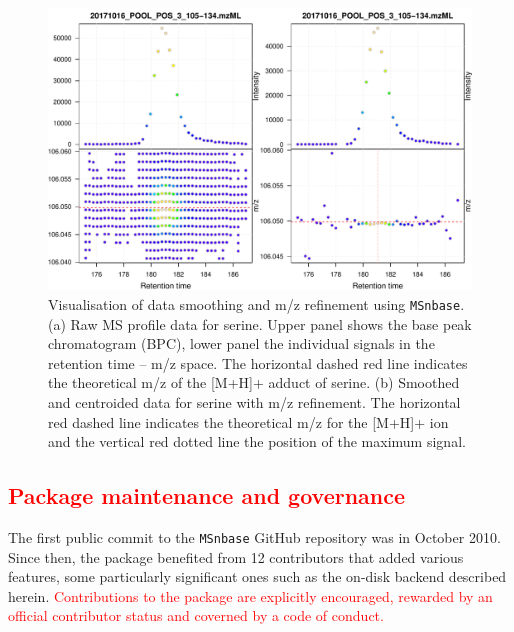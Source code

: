 \documentclass[journal=jacsat,manuscript=article]{achemso}\usepackage[]{graphicx}\usepackage[]{color}
\begin{document}
\begin{figure}
  \centering
  \includegraphics[width=\linewidth]{./figure/centroiding.pdf}
  \caption{Visualisation of data smoothing and m/z refinement using
    \texttt{MSnbase}. (a) Raw MS profile data for serine. Upper panel
    shows the base peak chromatogram (BPC), lower panel the individual
    signals in the retention time -- m/z space. The horizontal dashed
    red line indicates the theoretical m/z of the [M+H]+ adduct of
    serine. (b) Smoothed and centroided data for serine with m/z
    refinement. The horizontal red dashed line indicates the
    theoretical m/z for the [M+H]+ ion and the vertical red dotted
    line the position of the maximum signal. }
  \label{fig:cent}
\end{figure}


\subsection{\textcolor{red}{Package maintenance and governance}}

The first public commit to the \texttt{MSnbase} GitHub repository was
in October 2010. Since then, the package benefited from 12
contributors\cite{contribs} that added various features, some
particularly significant ones such as the on-disk backend described
herein. \textcolor{red}{Contributions to the package are explicitly
  encouraged, rewarded by an official contributor status and coverned
  by a code of conduct.}  
\end{document}
